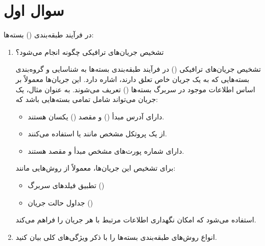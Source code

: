 \section{سوال اول}

در فرآیند طبقه‌بندی () بسته‌ها:  
\begin{enumerate}
	\item تشخیص جریان‌های ترافیکی چگونه انجام می‌شود؟
	\begin{qsolve}
		
		تشخیص جریان‌های ترافیکی () در فرآیند طبقه‌بندی بسته‌ها به شناسایی و گروه‌بندی بسته‌هایی که به یک جریان خاص تعلق دارند، اشاره دارد. این جریان‌ها معمولاً بر اساس اطلاعات موجود در سربرگ بسته‌ها () تعریف می‌شوند. به عنوان مثال، یک جریان می‌تواند شامل تمامی بسته‌هایی باشد که:
		\begin{itemize}
			\item دارای آدرس مبدأ () و مقصد () یکسان هستند.
			\item از یک پروتکل مشخص مانند  یا  استفاده می‌کنند.
			\item دارای شماره پورت‌های مشخص مبدأ و مقصد هستند.
		\end{itemize}
		برای تشخیص این جریان‌ها، معمولاً از روش‌هایی مانند:
		\begin{itemize}
			\item تطبیق فیلدهای سربرگ ()
			\item جداول حالت جریان ()
		\end{itemize}
		استفاده می‌شود که امکان نگهداری اطلاعات مرتبط با هر جریان را فراهم می‌کند.
		
	\end{qsolve}
	
	
	\newpage
	\item انواع روش‌های طبقه‌بندی بسته‌ها را با ذکر ویژگی‌های کلی بیان کنید.
	\begin{qsolve}
		

\end{qsolve}
\end{enumerate}
